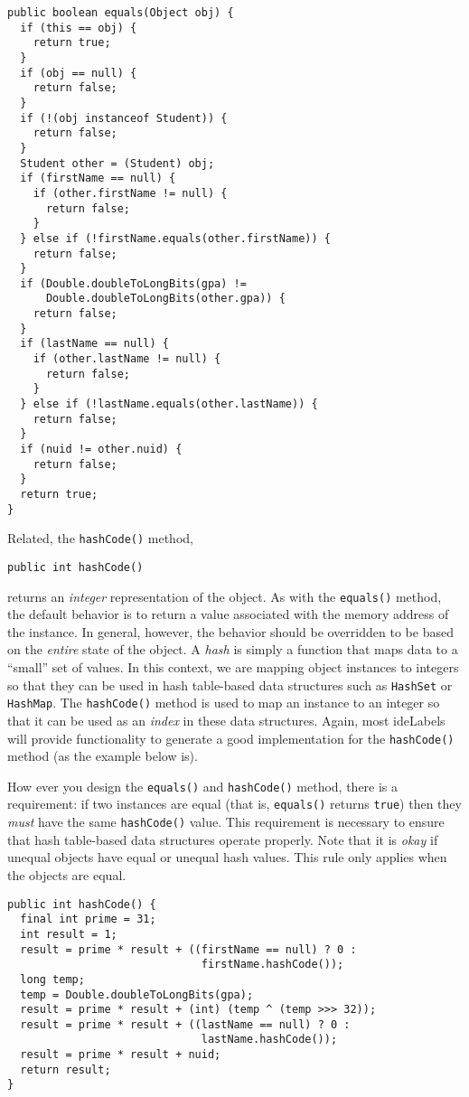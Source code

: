 \begin{verbatim}
public boolean equals(Object obj) {
  if (this == obj) {
    return true;
  }
  if (obj == null) {
    return false;
  }
  if (!(obj instanceof Student)) {
    return false;
  }
  Student other = (Student) obj;
  if (firstName == null) {
    if (other.firstName != null) {
      return false;
    }
  } else if (!firstName.equals(other.firstName)) {
    return false;
  }
  if (Double.doubleToLongBits(gpa) != 
      Double.doubleToLongBits(other.gpa)) {
    return false;
  }
  if (lastName == null) {
    if (other.lastName != null) {
      return false;
    }
  } else if (!lastName.equals(other.lastName)) {
    return false;
  }
  if (nuid != other.nuid) {
    return false;
  }
  return true;
}
\end{verbatim}

Related, the \texttt{hashCode()} method, 

\texttt{public int hashCode()}

returns an \emph{integer} representation of the object.  As with
the \texttt{equals()} method, the default behavior is
to return a value associated with the memory address of the instance.
In general, however, the behavior should be overridden to be based
on the \emph{entire} state of the object.  A \emph{hash} is simply
a function that maps data to a ``small'' set of values.  In this
context, we are mapping object instances to integers so that they
can be used in hash table-based data structures such as 
\texttt{HashSet} or \texttt{HashMap}.  The
\texttt{hashCode()} method is used to map an instance
to an integer so that it can be used as an \emph{index} in these
data structures.  Again, most \glspl{ideLabel} will provide
functionality to generate a good implementation for the 
\texttt{hashCode()} method (as the example below is).

How ever you design the \texttt{equals()} and 
\texttt{hashCode()} method, there is a requirement:
if two instances are equal (that is, \texttt{equals()}
returns \texttt{true}) then they \emph{must} have
the same \texttt{hashCode()} value.  This requirement
is necessary to ensure that hash table-based data structures
operate properly.  Note that it is \emph{okay} if unequal objects
have equal or unequal hash values.  This rule only applies when
the objects are equal.  

\begin{verbatim}
public int hashCode() {
  final int prime = 31;
  int result = 1;
  result = prime * result + ((firstName == null) ? 0 : 
                              firstName.hashCode());
  long temp;
  temp = Double.doubleToLongBits(gpa);
  result = prime * result + (int) (temp ^ (temp >>> 32));
  result = prime * result + ((lastName == null) ? 0 : 
                              lastName.hashCode());
  result = prime * result + nuid;
  return result;
}
\end{verbatim}

